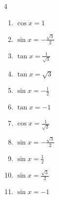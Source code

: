\begin{multicols}{4}
\begin{enumerate}
  \item $\displaystyle \cos{x}  = 1$

        \phantom{$\displaystyle x = 0$}

  \item $\displaystyle \sin{x}  = -\frac{\sqrt{3}}{2}$


  \item $\displaystyle \tan{x}  = \frac{1}{\sqrt{3}}$


  \item $\displaystyle \tan{x}  = \sqrt{3}$


  \item $\displaystyle \sin{x}  = -\frac{1}{2}$


  \item $\displaystyle \tan{x}  = -1$


  \item $\displaystyle \cos{x}  = \frac{1}{\sqrt{2}}$


  \item $\displaystyle \sin{x}  = -\frac{\sqrt{3}}{2}$


  \item $\displaystyle \sin{x}  = \frac{1}{2}$


\columnbreak %

\resetques

  \item $\displaystyle \sin{x}  = \frac{\sqrt{3}}{2}$


  \item $\displaystyle \sin{x}  = -1$


\end{enumerate}
\end{multicols}
